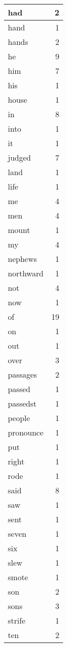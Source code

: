 \begin{center}
\begin{longtable}{l|r}
had & 2\\ \hline 
hand & 1\\ \hline 
hands & 2\\ \hline 
he & 9\\ \hline 
him & 7\\ \hline 
his & 1\\ \hline 
house & 1\\ \hline 
in & 8\\ \hline 
into & 1\\ \hline 
it & 1\\ \hline 
judged & 7\\ \hline 
land & 1\\ \hline 
life & 1\\ \hline 
me & 4\\ \hline 
men & 4\\ \hline 
mount & 1\\ \hline 
my & 4\\ \hline 
nephews & 1\\ \hline 
northward & 1\\ \hline 
not & 4\\ \hline 
now & 1\\ \hline 
of & 19\\ \hline 
on & 1\\ \hline 
out & 1\\ \hline 
over & 3\\ \hline 
passages & 2\\ \hline 
passed & 1\\ \hline 
passedst & 1\\ \hline 
people & 1\\ \hline 
pronounce & 1\\ \hline 
put & 1\\ \hline 
right & 1\\ \hline 
rode & 1\\ \hline 
said & 8\\ \hline 
saw & 1\\ \hline 
sent & 1\\ \hline 
seven & 1\\ \hline 
six & 1\\ \hline 
slew & 1\\ \hline 
smote & 1\\ \hline 
son & 2\\ \hline 
sons & 3\\ \hline 
strife & 1\\ \hline 
ten & 2\\ \hline 

\end{longtable}
\end{center}
